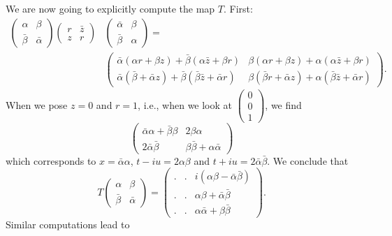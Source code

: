 We are now going to explicitly compute the map $T$. First:
\[
	\begin{split}
		\begin{pmatrix}
			\alpha    & \beta       \\
			\bar\beta & \bar \alpha
		\end{pmatrix}
		\begin{pmatrix}
			r & \bar z \\
			z & r
		\end{pmatrix}
		&
		\begin{pmatrix}
			\bar\alpha & \beta  \\
			\bar\beta  & \alpha
		\end{pmatrix}=\\
		&\begin{pmatrix}
			\bar\alpha(\alpha r+\beta z)+\bar\beta(\alpha\bar z+\beta r)               & \beta(\alpha r+\beta z)+\alpha(\alpha\bar z+\beta r)                 \\
			\bar\alpha(\bar\beta+\bar\alpha z)+\bar\beta(\bar\beta\bar z+\bar\alpha r) & \beta(\bar\beta r+\bar\alpha z)+\alpha(\bar\beta\bar z+\bar\alpha r)
		\end{pmatrix}.
	\end{split}
\]
When we pose $z=0$ and $r=1$, i.e., when we look at $\begin{pmatrix}
		0 \\0\\1
	\end{pmatrix}$, we find
\[
	\begin{pmatrix}
		\bar\alpha\alpha+\bar\beta\beta & 2\beta\alpha                    \\
		2\bar\alpha\bar\beta            & \beta\bar\beta+\alpha\bar\alpha
	\end{pmatrix}
\]
which corresponds to $x=\bar\alpha\alpha$, $t-iu=2\alpha\beta$ and $t+iu=2\bar\alpha\bar\beta$. We conclude that
\[
	T\begin{pmatrix}
		\alpha & \beta \\\bar\beta&\bar\alpha
	\end{pmatrix}
	=
	\begin{pmatrix}
		. & . & i(\alpha\beta-\bar\alpha\bar\beta) \\
		. & . & \alpha\beta+\bar\alpha\bar\beta    \\
		. & . & \alpha\bar\alpha+\beta\bar\beta
	\end{pmatrix}.
\]
Similar computations lead to
